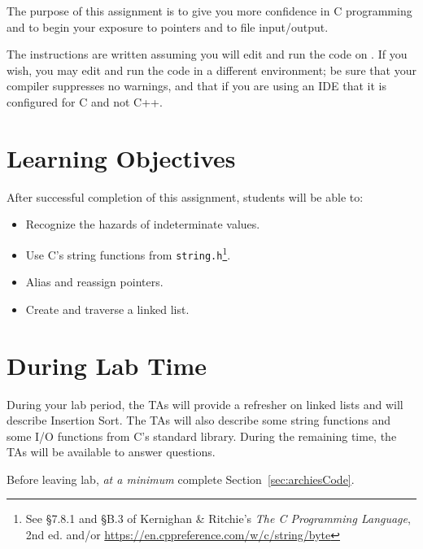 The purpose of this assignment is to give you more confidence in C programming and to begin your exposure to pointers and to file input/output.

The instructions are written assuming you will edit and run the code on \runtimeenvironment.
If you wish, you may edit and run the code in a different environment;
be sure that your compiler suppresses no warnings, and that if you are using an IDE that it is configured for C and not C++.

\tableofcontents

\section*{Learning Objectives}

After successful completion of this assignment, students will be able to:
\begin{itemize}
    \item Recognize the hazards of indeterminate values.
    \item Use C's string functions from \lstinline{string.h}\footnote{\label{note:stringFunctions}See \S7.8.1 and \S{}B.3 of Kernighan \& Ritchie's \textit{The C Programming Language}, 2nd ed. and/or \url{https://en.cppreference.com/w/c/string/byte}}.
    \item Alias and reassign pointers.
    \item Create and traverse a linked list.
\end{itemize}

\section*{During Lab Time}

During your lab period, the TAs will provide a refresher on linked lists and will describe Insertion Sort.
The TAs will also describe some string functions and some I/O functions from C's standard library.
During the remaining time, the TAs will be available to answer questions.

Before leaving lab, \textit{at a minimum} complete Section~\ref{sec:archiesCode}.
